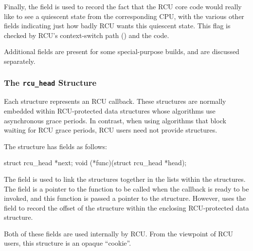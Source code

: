 Finally, the  field is used to record the fact that
the RCU core code would really like to see a quiescent state from the
corresponding CPU, with the various other fields indicating just how
badly RCU wants this quiescent state.
This flag is checked by RCU's
context-switch path () and the 
code.

\QuickQuizEnd

Additional fields are present for some special-purpose builds, and are
discussed separately.

\subsubsection{The \texttt{rcu\_head} Structure}

Each  structure represents an RCU callback.
These structures
are normally embedded within RCU-protected data structures whose
algorithms use asynchronous grace periods.
In contrast, when using
algorithms that block waiting for RCU grace periods, RCU users need not
provide  structures.

The  structure has fields as follows:

\begin{VerbatimN}
		struct rcu_head *next;
		void (*func)(struct rcu_head *head);
\end{VerbatimN}

The  field is used to link the  structures
together in the lists within the  structures.
The 
field is a pointer to the function to be called when the callback is
ready to be invoked, and this function is passed a pointer to the
 structure.
However,  uses the 
field to record the offset of the  structure within the
enclosing RCU-protected data structure.

Both of these fields are used internally by RCU\@.
From the viewpoint of
RCU users, this structure is an opaque ``cookie''.

\QuickQuizEnd

